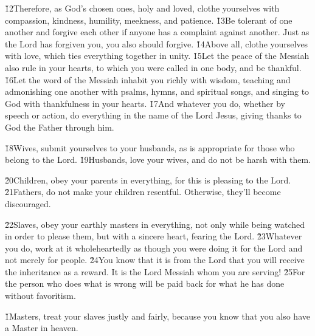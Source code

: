 \v{12}Therefore, as God's chosen ones, holy and loved, clothe yourselves with compassion, kindness, humility, meekness, and patience. \v{13}Be tolerant of one another and forgive each other if anyone has a complaint against another. Just as the Lord has forgiven you, you also should forgive. \v{14}Above all, clothe yourselves with love, which ties everything together in unity. \v{15}Let the peace of the Messiah also rule in your hearts, to which you were called in one body, and be thankful. \v{16}Let the word of the Messiah inhabit you richly with wisdom, teaching and admonishing one another with psalms, hymns, and spiritual songs, and singing to God with thankfulness in your hearts. \v{17}And whatever you do, whether by speech or action, do everything in the name of the Lord Jesus, giving thanks to God the Father through him.

\v{18}Wives, submit yourselves to your husbands, as is appropriate for those who belong to the Lord. \v{19}Husbands, love your wives, and do not be harsh with them.

\v{20}Children, obey your parents in everything, for this is pleasing to the Lord. \v{21}Fathers, do not make your children resentful. Otherwise, they'll become discouraged.

\v{22}Slaves, obey your earthly masters in everything, not only while being watched in order to please them, but with a sincere heart, fearing the Lord. \v{23}Whatever you do, work at it wholeheartedly as though you were doing it for the Lord and not merely for people. \v{24}You know that it is from the Lord that you will receive the inheritance as a reward. It is the Lord Messiah whom you are serving! \v{25}For the person who does what is wrong will be paid back for what he has done without favoritism.

\v{1}Masters, treat your slaves justly and fairly, because you know that you also have a Master in heaven.

